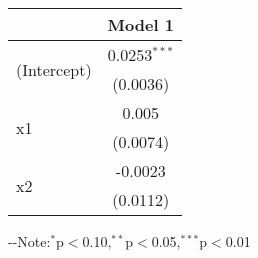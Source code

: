 \begin{table}[H] 
\centering 
\label{}
\begin{threeparttable}
\begin{tabular}{lc}
\toprule 
& Model 1 \\ 
\midrule 
\multirow{2}{*}{(Intercept)}&0.0253$^{***}$ \\ 
& (0.0036) \\ 
\multirow{2}{*}{x1}&0.005 \\ 
& (0.0074) \\ 
\multirow{2}{*}{x2}&-0.0023 \\ 
& (0.0112) \\ 
\bottomrule 
\end{tabular} 
\begin{tablenotes} 
\scriptsize 
\item \leavevmode\kern-\scriptspace\kern- Note:$^{*}$p$<$0.10,$^{**}$p$<$0.05,$^{***}$p$<$0.01  
\end{tablenotes}
\end{threeparttable} 
\end{table} 
 